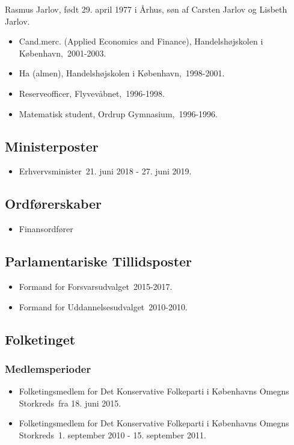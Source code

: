 \documentclass[11pt, a4paper]{awesome-cv}
\begin{document}
\makecvheader[R]
\makelettertitle
\begin{cvletter}
Rasmus Jarlov, født 29. april 1977 i Århus, søn af Carsten Jarlov og Lisbeth Jarlov.

\begin{itemize}
\item Cand.merc. (Applied Economics and Finance), Handelshøjskolen i København, 2001-2003.
\item Ha (almen), Handelshøjskolen i København, 1998-2001.
\item Reserveofficer, Flyvevåbnet, 1996-1998.
\item Matematisk student, Ordrup Gymnasium, 1996-1996.
\end{itemize}
\subsection*{Ministerposter}
\begin{itemize}
\item Erhvervsminister 21. juni 2018 - 27. juni 2019.
\end{itemize}
\subsection*{Ordførerskaber}
\begin{itemize}
\item Finansordfører
\end{itemize}
\subsection*{Parlamentariske Tillidsposter}
\begin{itemize}
\item Formand for Forsvarsudvalget 2015-2017.
\item Formand for Uddannelsesudvalget 2010-2010.
\end{itemize}
\subsection*{Folketinget}
\subsubsection*{Medlemsperioder}
\begin{itemize}
\item Folketingsmedlem for Det Konservative Folkeparti i Københavns Omegns Storkreds fra 18. juni 2015.
\item Folketingsmedlem for Det Konservative Folkeparti i Københavns Omegns Storkreds 1. september 2010 - 15. september 2011.
\end{itemize}

\end{cvletter}
\end{document}
